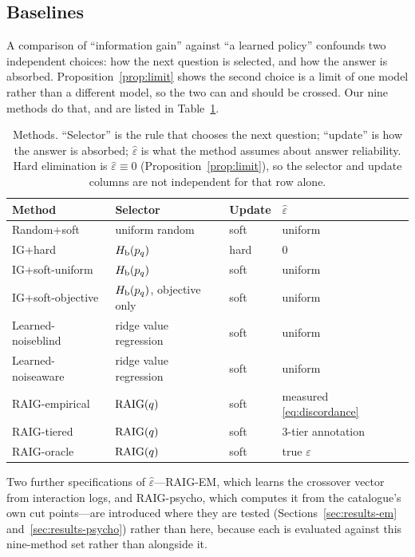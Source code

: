 \subsection{Baselines}
\label{sec:baselines}

A comparison of ``information gain'' against ``a learned policy'' confounds two
independent choices: how the next question is selected, and how the answer is
absorbed. Proposition~\ref{prop:limit} shows the second choice is a limit of one
model rather than a different model, so the two can and should be crossed. Our
nine methods do that, and are listed in Table~\ref{tab:baselines}.

\begin{table}[t]
\caption{Methods. ``Selector'' is the rule that chooses the next question;
``update'' is how the answer is absorbed; $\hat\varepsilon$ is what the method
assumes about answer reliability. Hard elimination is
$\hat\varepsilon \equiv 0$ (Proposition~\ref{prop:limit}), so the selector and
update columns are not independent for that row alone.}
\label{tab:baselines}
\centering
\scriptsize
\begin{tabular}{@{}llll@{}}
\toprule
\textbf{Method} & \textbf{Selector} & \textbf{Update} & \textbf{$\hat\varepsilon$} \\
\midrule
Random+soft         & uniform random & soft & uniform \\
IG+hard             & $H_{\mathrm{b}}(p_q)$     & hard & $0$ \\
IG+soft-uniform     & $H_{\mathrm{b}}(p_q)$     & soft & uniform \\
IG+soft-objective   & $H_{\mathrm{b}}(p_q)$, objective only & soft & uniform \\
Learned-noiseblind  & ridge value regression & soft & uniform \\
Learned-noiseaware  & ridge value regression & soft & uniform \\
RAIG-empirical      & $\mathrm{RAIG}(q)$     & soft & measured \eqref{eq:discordance} \\
RAIG-tiered         & $\mathrm{RAIG}(q)$     & soft & 3-tier annotation \\
RAIG-oracle         & $\mathrm{RAIG}(q)$     & soft & true $\varepsilon$ \\
\bottomrule
\end{tabular}
\end{table}

Two further specifications of $\hat\varepsilon$---RAIG-EM, which learns the
crossover vector from interaction logs, and RAIG-psycho, which computes it from
the catalogue's own cut points---are introduced where they are tested
(Sections~\ref{sec:results-em} and~\ref{sec:results-psycho}) rather than here,
because each is evaluated against this nine-method set rather than alongside it.

